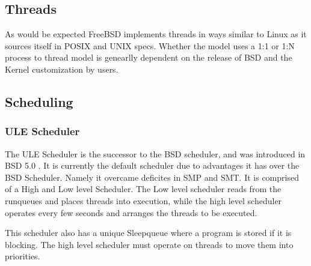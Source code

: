 \documentclass[letterpaper,10pt,notitlepage,fleqn]{article}
\begin{document}
\subsection{Threads}

As would be expected FreeBSD implements threads in ways similar to Linux as it sources
itself in POSIX and UNIX specs. Whether the model uses a 1:1 or 1:N process to thread model
is genearlly dependent on the release of BSD and the Kernel customization by users. 

\subsection{Scheduling}

\subsubsection{ ULE Scheduler }
The ULE Scheduler is the successor to the BSD scheduler, and was introduced in BSD 5.0 
\cite{BSDProc}. It is currently the default scheduler due to advantages it has over the
BSD Scheduler. Namely it overcame deficites in SMP and SMT. It is comprised of a High 
and Low level Scheduler. The Low level scheduler \cite{ULE} reads from the runqueues and 
places threads into execution, while the high level scheduler operates every few seconds and
arranges the threads to be executed. 

This scheduler also has a unique Sleepqueue where a program is stored if it is blocking. The 
high level scheduler must operate on threads to move them into priorities.  
\end{document}
